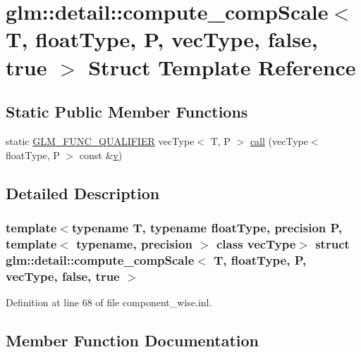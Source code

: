 \hypertarget{structglm_1_1detail_1_1compute__comp_scale_3_01_t_00_01float_type_00_01_p_00_01vec_type_00_01false_00_01true_01_4}{}\section{glm\+::detail\+::compute\+\_\+comp\+Scale$<$ T, float\+Type, P, vec\+Type, false, true $>$ Struct Template Reference}
\label{structglm_1_1detail_1_1compute__comp_scale_3_01_t_00_01float_type_00_01_p_00_01vec_type_00_01false_00_01true_01_4}
\subsection*{Static Public Member Functions}
\begin{DoxyCompactItemize}
\item 
static \mbox{\hyperlink{setup_8hpp_a33fdea6f91c5f834105f7415e2a64407}{G\+L\+M\+\_\+\+F\+U\+N\+C\+\_\+\+Q\+U\+A\+L\+I\+F\+I\+ER}} vec\+Type$<$ T, P $>$ \mbox{\hyperlink{structglm_1_1detail_1_1compute__comp_scale_3_01_t_00_01float_type_00_01_p_00_01vec_type_00_01false_00_01true_01_4_a41a36fdb28402c068ed68df6803e7780}{call}} (vec\+Type$<$ float\+Type, P $>$ const \&\mbox{\hyperlink{glad_8h_a14cfbe2fc2234f5504618905b69d1e06}{v}})
\end{DoxyCompactItemize}


\subsection{Detailed Description}
\subsubsection*{template$<$typename T, typename float\+Type, precision P, template$<$ typename, precision $>$ class vec\+Type$>$\newline
struct glm\+::detail\+::compute\+\_\+comp\+Scale$<$ T, float\+Type, P, vec\+Type, false, true $>$}



Definition at line 68 of file component\+\_\+wise.\+inl.



\subsection{Member Function Documentation}
\mbox{\label{structglm_1_1detail_1_1compute__comp_scale_3_01_t_00_01float_type_00_01_p_00_01vec_type_00_01false_00_01true_01_4_a41a36fdb28402c068ed68df6803e7780}} 
